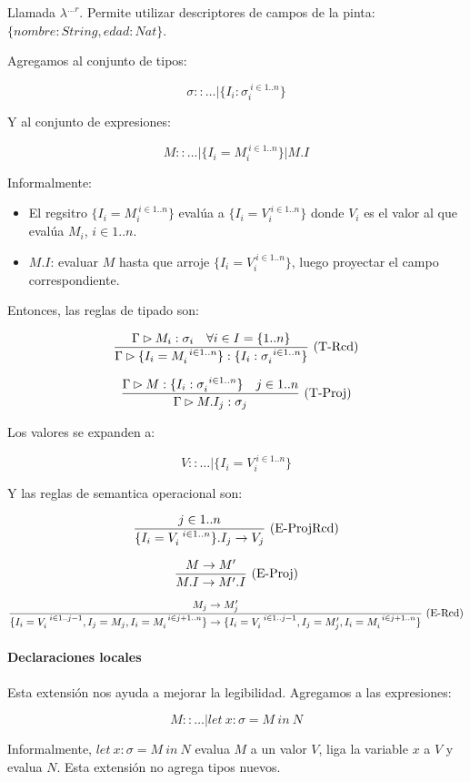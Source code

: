 Llamada $\lambda^{\dots r}$. Permite utilizar descriptores de campos de la pinta: $\{nombre: String, edad: Nat\}$.

Agregamos al conjunto de tipos:

\[\sigma :: \dots \vert \{I_i : \sigma_i^{\ i \in 1..n}\}\]

Y al conjunto de expresiones:

\[M :: \dots \vert \{I_i = M_i^{\ i \in 1..n}\} \vert M.I\]

Informalmente:
\begin{itemize}
  \item El regsitro $\{I_i = M_i^{\ i \in 1..n}\}$ evalúa a $\{I_i = V_i^{\ i \in 1..n}\}$ donde $V_i$ es el valor al que evalúa $M_i$, $i \in 1..n$.
  \item $M.I$: evaluar $M$ hasta que arroje $\{I_i = V_i^{\ i \in 1..n}\}$, luego proyectar el campo correspondiente.
\end{itemize}

Entonces, las reglas de tipado son:

\[\frac{\Gamma \rhd M_i : \sigma_i\quad \forall i \in I = \{1..n\}}{\Gamma \rhd \{I_i = M_i^{\ i \in 1..n}\}:\{I_i : \sigma_i^{\ i \in 1..n}\}}\ \text{(T-Rcd)}\]

\[\frac{\Gamma \rhd M : \{I_i : \sigma_{i}^{\ i \in 1..n}\}\quad j\in 1..n}{\Gamma \rhd M.I_j : \sigma_j}\ \text{(T-Proj)}\]

Los valores se expanden a:

\[V :: \dots \vert \{I_i = V_i^{\ i \in 1..n}\}\]

Y las reglas de semantica operacional son:

\[\frac{j \in 1..n}{\{I_i = V_i^{\ i \in 1..n}\}.I_j \to V_j}\ \text{(E-ProjRcd)}\]

\[\frac{M \to M'}{M.I \to M'.I}\ \text{(E-Proj)}\]

\[\deriv{M_j \to M_j'}{\{I_i = V_i^{\ i \in 1..j-1}, I_j = M_j, I_i = M_i^{\ i \in j+1..n}\} \to \{I_i = V_i^{\ i \in 1..j-1}, I_j = M_j', I_i = M_i^{\ i \in j+1..n}\}}{E-Rcd}\]

\paragraph{Declaraciones locales}

Esta extensión nos ayuda a mejorar la legibilidad. Agregamos a las expresiones:

\[M :: \dots \vert let\ x : \sigma = M\ in\ N\]

Informalmente, $let\ x : \sigma = M\ in\ N$ evalua $M$ a un valor $V$, liga la variable $x$ a $V$ y evalua $N$.
Esta extensión no agrega tipos nuevos.

